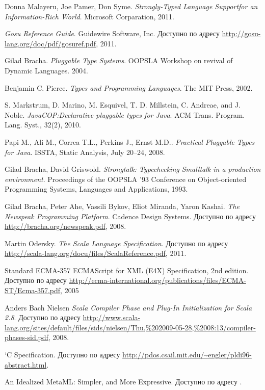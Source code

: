 \begin{thebibliography}{9}

    Donna Malayeru, Joe Pamer, Don Syme.
    \emph{Strongly-Typed Language Supportfor an Information-Rich World}.
    Microsoft Corparation,
    2011.

    \emph{Gosu Reference Guide}.
    Guidewire Software, Inc.
    Доступно по адресу \url{http://gosu-lang.org/doc/pdf/gosuref.pdf},
    2011.

    Gilad Bracha.
    \emph{Pluggable Type Systems}.
    OOPSLA Workshop on revival of Dynamic Languages.
    2004.

    Benjamin C. Pierce.
    \emph{Types and Programming Languages}.
    The MIT Press, 2002.

    S. Markstrum, D. Marino, M. Esquivel, T. D. Millstein, C. Andreae, and J. Noble.
    \emph{JavaCOP:\@ Declarative pluggable types for Java}.
    ACM Trans. Program. Lang. Syst., 32(2), 2010.

    Papi M., Ali M., Correa T.L., Perkins J., Ernst M.D..
    \emph{Practical Pluggable Types for Java}.
    ISSTA, Static Analysis, July 20–24, 2008.

    Gilad Bracha, David Griswold.
    \emph{Strongtalk: Typechecking Smalltalk in a production environment}.
    Proceedings of the OOPSLA '93 Conference on Object-oriented Programming Systems, Languages and Applications, 1993.

    Gilad Bracha, Peter Ahe, Vassili Bykov, Eliot Miranda, Yaron Kashai.
    \emph{The Newspeak Programming Platform}.
    Cadence Design Systems.
    Доступно по адресу \url{http://bracha.org/newspeak.pdf},
    2008.

    Martin Odersky.
    \emph{The Scala Language Specification}.
    Доступно по адресу \url{http://scala-lang.org/docu/files/ScalaReference.pdf},
    2011.

    Standard ECMA-357
    ECMAScript for XML (E4X) Specification,
    2nd edition.
    Доступно по адресу \url{http://ecma-international.org/publications/files/ECMA-ST/Ecma-357.pdf},
    2005

    Anders Bach Nielsen
    \emph{Scala Compiler Phase and Plug-In Initialization for Scala 2.8}.
    Доступно по адресу \url{http://www.scala-lang.org/sites/default/files/sids/nielsen/Thu,%202009-05-28,%2008:13/compiler-phases-sid.pdf},
    2008.

    `C Specification.
    Доступно по адресу \url{http://pdos.csail.mit.edu/~engler/pldi96-abstract.html}.

    An Idealized MetaML: Simpler, and More Expressive.
    Доступно по адресу \url{}.

\end{thebibliography}